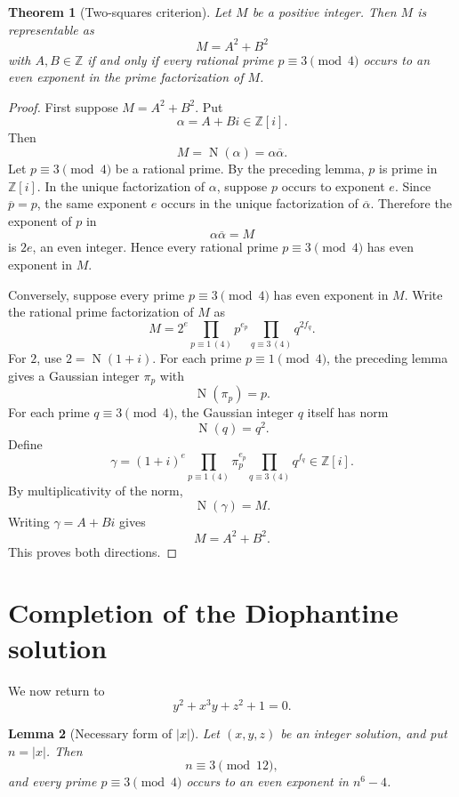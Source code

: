 \documentclass[11pt]{article}
\newtheorem{theorem}{Theorem}
\newtheorem{lemma}[theorem]{Lemma}
\theoremstyle{definition}
\theoremstyle{remark}
\newcommand{\Z}{\mathbb Z}
\newcommand{\Zi}{\mathbb Z[i]}
\newcommand{\Norm}{\operatorname N}
\begin{document}
\begin{theorem}[Two-squares criterion]
Let $M$ be a positive integer.  Then $M$ is representable as
\[
        M=A^2+B^2
\]
with $A,B\in\Z$ if and only if every rational prime $p\equiv3\pmod4$ occurs to an even exponent in the prime factorization of $M$.
\end{theorem}

\begin{proof}
First suppose $M=A^2+B^2$.  Put
\[
        \alpha=A+Bi\in\Zi.
\]
Then
\[
        M=\Norm(\alpha)=\alpha\overline{\alpha}.
\]
Let $p\equiv3\pmod4$ be a rational prime.  By the preceding lemma, $p$ is prime in $\Zi$.  In the unique factorization of $\alpha$, suppose $p$ occurs to exponent $e$.  Since $\overline p=p$, the same exponent $e$ occurs in the unique factorization of $\overline\alpha$.  Therefore the exponent of $p$ in
\[
        \alpha\overline\alpha=M
\]
is $2e$, an even integer.  Hence every rational prime $p\equiv3\pmod4$ has even exponent in $M$.

Conversely, suppose every prime $p\equiv3\pmod4$ has even exponent in $M$.  Write the rational prime factorization of $M$ as
\[
        M=2^e
        \prod_{p\equiv1\, (4)}p^{e_p}
        \prod_{q\equiv3\, (4)}q^{2f_q}.
\]
For $2$, use $2=\Norm(1+i)$.  For each prime $p\equiv1\pmod4$, the preceding lemma gives a Gaussian integer $\pi_p$ with
\[
        \Norm(\pi_p)=p.
\]
For each prime $q\equiv3\pmod4$, the Gaussian integer $q$ itself has norm
\[
        \Norm(q)=q^2.
\]
Define
\[
        \gamma=(1+i)^e
        \prod_{p\equiv1\, (4)}\pi_p^{e_p}
        \prod_{q\equiv3\, (4)}q^{f_q}
        \in\Zi.
\]
By multiplicativity of the norm,
\[
        \Norm(\gamma)=M.
\]
Writing $\gamma=A+Bi$ gives
\[
        M=A^2+B^2.
\]
This proves both directions.
\end{proof}

\section{Completion of the Diophantine solution}

We now return to
\[
        y^2+x^3y+z^2+1=0.
\]

\begin{lemma}[Necessary form of $|x|$]
Let $(x,y,z)$ be an integer solution, and put $n=|x|$.  Then
\[
        n\equiv3\pmod {12},
\]
and every prime $p\equiv3\pmod4$ occurs to an even exponent in $n^6-4$.
\end{lemma}
\end{document}
